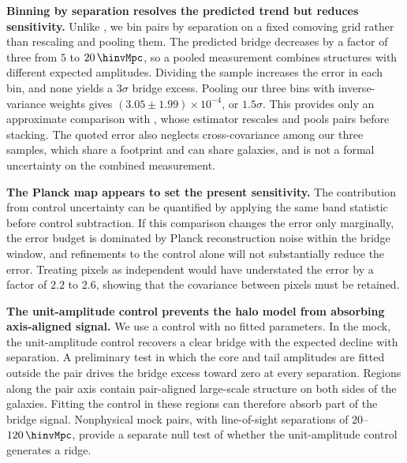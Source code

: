\textbf{Binning by separation resolves the predicted trend but reduces
sensitivity.} Unlike \citet{deGraaff2019}, we bin pairs by separation on a
fixed comoving grid rather than rescaling and pooling them. The predicted
bridge decreases by a factor of three from $5$ to $20\,\hinvMpc$, so a pooled
measurement combines structures with different expected amplitudes. Dividing
the sample increases the error in each bin, and none yields a $3\sigma$
bridge excess. Pooling our three bins with inverse-variance weights gives
$\left(3.05\pm1.99\right)\times10^{-4}$, or $1.5\sigma$. This provides only an
approximate comparison with \citet{deGraaff2019}, whose estimator rescales and
pools pairs before stacking. The quoted error also neglects cross-covariance among our
three samples, which share a footprint and can share galaxies, and is not a
formal uncertainty on the combined measurement.

\textbf{The Planck map appears to set the present sensitivity.} The
contribution from control uncertainty can be quantified by applying the same
band statistic before control subtraction.
If this comparison changes the error only marginally, the error budget is
dominated by Planck reconstruction noise within the bridge window, and
refinements to the control alone will not substantially reduce the error.
Treating pixels as independent would have understated
the error by a factor of $2.2$ to $2.6$, %
showing that the covariance between pixels must be retained.

\textbf{The unit-amplitude control prevents the halo model from absorbing
axis-aligned signal.}
We use a control with no fitted parameters. In the mock, the unit-amplitude
control recovers a clear bridge with the expected decline with separation. A
preliminary test in which the core and tail amplitudes are fitted outside the
pair drives the bridge excess toward zero at every separation.
Regions along the pair axis contain pair-aligned large-scale structure on both
sides of the galaxies. Fitting the control in these regions can therefore
absorb part of the bridge signal. Nonphysical mock pairs, with
line-of-sight separations of
$20$--$120\,\hinvMpc$, provide a separate null test of whether the
unit-amplitude control generates a ridge. %

